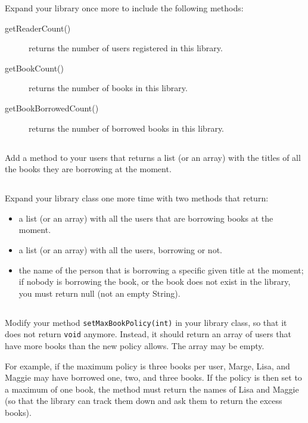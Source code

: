 \documentclass{article}
\begin{document}
Expand your library once more to include the following methods: 

\begin{description}
\item[getReaderCount()] returns the number of users registered in this
  library. 
\item[getBookCount()] returns the number of books in this library.
\item[getBookBorrowedCount()] returns the number of borrowed books in
  this library. 
\end{description}

\subsection{}

Add a method to your users that returns a list (or an array) with the
titles of all the books they are borrowing at the moment. 

\subsection{}

Expand your library class one more time with two methods that return: 

\begin{itemize}
\item a list (or an array) with all the users that are borrowing books
  at the moment.
\item a list (or an array) with all the users, borrowing or not.
\item the name of the person that is borrowing a specific given title
  at the moment; if nobody is borrowing the book, or the book does not
  exist in the library, you must return null (not an empty String). 
\end{itemize}

\subsection{}

Modify your method \verb+setMaxBookPolicy(int)+ in your library class,
so that it does not return \verb+void+ anymore. Instead, it should
return an array of users that have more books than the new policy
allows. The array may be empty. 

For example, if the maximum policy is three books per user, Marge,
Lisa, and Maggie may have borrowed one, two, and three books. If the
policy is then set to a maximum of one book, the method must return
the names of Lisa and Maggie (so that the library can track them down
and ask them to return the excess books).
\end{document}
